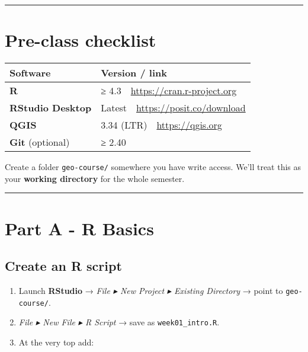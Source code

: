 \documentclass[
  letterpaper,
  DIV=11,
  numbers=noendperiod]{scrreprt}
\providecommand{\tightlist}{%
  \setlength{\itemsep}{0pt}\setlength{\parskip}{0pt}}\usepackage{longtable,booktabs,array}
\begin{document}
\begin{center}\rule{0.5\linewidth}{0.5pt}\end{center}

\hypertarget{pre-class-checklist}{%
\section{Pre-class checklist}\label{pre-class-checklist}}

\begin{longtable}[]{@{}ll@{}}
\toprule\noalign{}
Software & Version / link \\
\midrule\noalign{}
\endhead
\bottomrule\noalign{}
\endlastfoot
\textbf{R} & ≥ 4.3 \url{https://cran.r-project.org} \\
\textbf{RStudio Desktop} & Latest \url{https://posit.co/download} \\
\textbf{QGIS} & 3.34 (LTR) \url{https://qgis.org} \\
\textbf{Git} (optional) & ≥ 2.40 \\
\end{longtable}

Create a folder \texttt{geo-course/} somewhere you have write access.
We'll treat this as your \textbf{working directory} for the whole
semester.

\begin{center}\rule{0.5\linewidth}{0.5pt}\end{center}

\hypertarget{part-a---r-basics}{%
\section{Part A - R Basics}\label{part-a---r-basics}}

\hypertarget{create-an-r-script}{%
\subsection{Create an R script}\label{create-an-r-script}}

\begin{enumerate}
\def\labelenumi{\arabic{enumi}.}
\tightlist
\item
  Launch \textbf{RStudio} → \emph{File ▸ New Project ▸ Existing
  Directory} → point to \texttt{geo-course/}.
\item
  \emph{File ▸ New File ▸ R Script} → save as \texttt{week01\_intro.R}.
\item
  At the very top add:
\end{enumerate}
\end{document}
